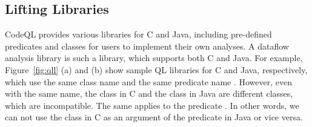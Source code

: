 \subsection{Lifting Libraries}

CodeQL provides various libraries for C and Java, including pre-defined
predicates and classes for users to implement their own analyses.  A dataflow
analysis library is such a library, which supports both C and Java.  For
example, Figure~\ref{fig:qll} (a) and (b) show sample QL libraries for C and
Java, respectively, which use the same class name  and the same
predicate name .  However, even with the same name, the
class  in C and the class  in Java are different
classes, which are incompatible.  The same applies to the predicate
.  In other words, we can not use the class 
in C as an argument of the predicate  in Java or vice
versa.

